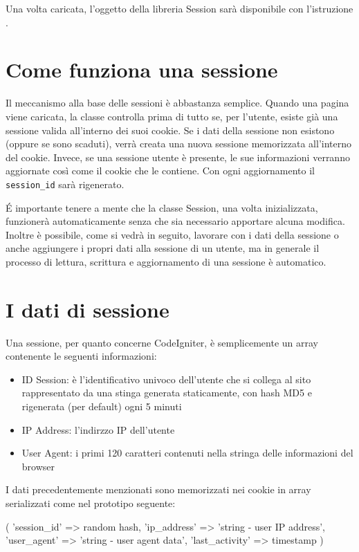 Una volta caricata, l'oggetto della libreria Session sarà disponibile con l'istruzione .

\section*{Come funziona una sessione}

Il meccanismo alla base delle sessioni è abbastanza semplice. Quando una pagina viene caricata, la classe controlla prima di tutto se, per l'utente, esiste già una sessione valida all'interno dei suoi cookie. Se i dati della sessione non esistono (oppure se sono scaduti), verrà creata una nuova sessione memorizzata all'interno del cookie. Invece, se una sessione utente è presente, le sue informazioni verranno aggiornate così come il cookie che le contiene. Con ogni aggiornamento il \verb|session_id| sarà rigenerato.

\'E importante tenere a mente che la classe Session, una volta inizializzata, funzionerà automaticamente senza che sia necessario apportare alcuna modifica. Inoltre è possibile, come si vedrà in seguito, lavorare con i dati della sessione o anche aggiungere i propri dati alla sessione di un utente, ma in generale il processo di lettura, scrittura e aggiornamento di una sessione è automatico.

\section*{I dati di sessione}

Una sessione, per quanto concerne CodeIgniter, è semplicemente un array contenente le seguenti informazioni:

\begin{itemize}
\item ID Session: è l'identificativo univoco dell'utente che si collega al sito rappresentato da una stinga generata staticamente, con hash MD5 e rigenerata (per default) ogni 5 minuti
\item IP Address: l'indirzzo IP dell'utente
\item User Agent: i primi 120 caratteri contenuti nella stringa delle informazioni del browser
\end{itemize}

I dati precedentemente menzionati sono memorizzati nei cookie in array serializzati come nel prototipo seguente:

\begin{code}
[array]
(
     'session_id'    => random hash,
     'ip_address'    => 'string - user IP address',
     'user_agent'    => 'string - user agent data',
     'last_activity' => timestamp
)
\end{code}

